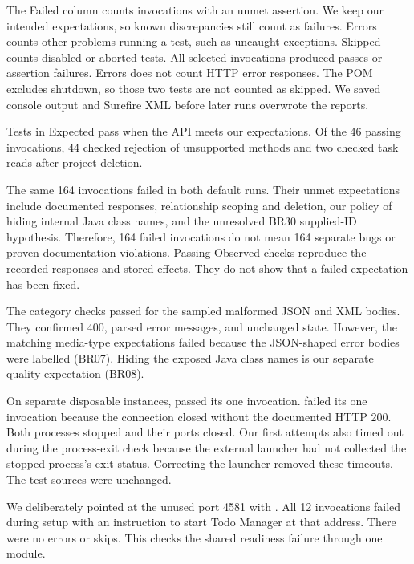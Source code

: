 \documentclass[12pt,letterpaper]{article}
\begin{document}
The Failed column counts invocations with an unmet assertion.
We keep our intended expectations, so known discrepancies still count as failures.
Errors counts other problems running a test, such as uncaught exceptions.
Skipped counts disabled or aborted tests. All selected invocations produced
passes or assertion failures. Errors does not count HTTP error responses.
The POM excludes shutdown, so those two tests are not counted as skipped.
We saved console output and Surefire XML before later runs overwrote the reports.

Tests in Expected pass when the API meets our expectations. Of the 46 passing invocations,
44 checked rejection of unsupported methods and two checked task reads after
project deletion.

The same 164 invocations failed in both default runs. Their unmet expectations
include documented responses, relationship scoping and deletion, our policy of
hiding internal Java class names, and the unresolved BR30 supplied-ID hypothesis.
Therefore, 164 failed invocations do not mean 164 separate bugs or proven
documentation violations. Passing Observed checks reproduce the recorded
responses and stored effects. They do not show that a failed expectation has been fixed.

The category  checks passed for the sampled
malformed JSON and XML bodies. They confirmed 400, parsed error messages, and
unchanged state. However, the matching media-type expectations failed because
the JSON-shaped error bodies were labelled  (BR07).
Hiding the exposed Java class names is our separate quality expectation (BR08).

On separate disposable instances,
 passed its one invocation.
 failed its one invocation because the connection
closed without the documented HTTP 200. Both processes stopped and their ports
closed. Our first attempts also timed out during the process-exit check because
the external launcher had not collected the stopped process's exit status.
Correcting the launcher removed these timeouts. The test sources were unchanged.

\NewContentPage
{}
We deliberately pointed  at the unused
port 4581 with . All 12 invocations
failed during setup with an instruction to start Todo Manager at that address.
There were no errors or skips. This checks the shared readiness failure through
one module.
\end{document}
